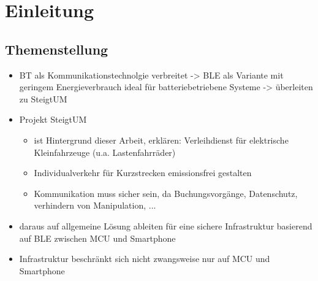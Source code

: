 \documentclass[doktyp=barbeit]{TUBAFarbeiten}
\begin{document}
\maketitle

\TUBAFErklaerungsseite



\tableofcontents
\listoffigures
\listoftables

\section{Einleitung}
\subsection{Themenstellung}
\begin{itemize}
	\item BT als Kommunikationstechnolgie verbreitet -> BLE als Variante mit geringem Energieverbrauch ideal für batteriebetriebene Systeme -> überleiten zu SteigtUM
	\item Projekt SteigtUM
	\begin{itemize}
		\item ist Hintergrund dieser Arbeit, erklären: Verleihdienst für elektrische Kleinfahrzeuge (u.a. Lastenfahrräder)
		\item Individualverkehr für Kurzstrecken emissionsfrei gestalten
		\item Kommunikation muss sicher sein, da Buchungsvorgänge, Datenschutz, verhindern von Manipulation, ...
	\end{itemize}
	\item daraus auf allgemeine Lösung ableiten für eine sichere Infrastruktur basierend auf BLE zwischen MCU und Smartphone
	\item Infrastruktur beschränkt sich nicht zwangsweise nur auf MCU und Smartphone
\end{itemize}
\end{document}
